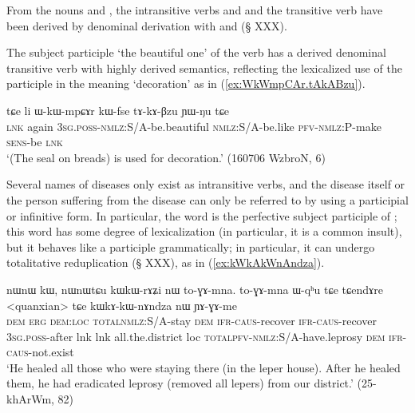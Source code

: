 From the nouns   and  , the intransitive verbs  and  and the transitive verb  have been derived by denominal derivation with  and  (§ XXX).

The subject participle  `the beautiful one' of the verb  has a derived denominal transitive verb  with highly derived semantics, reflecting the lexicalized use of the participle in the meaning `decoration' as in (\ref{ex:WkWmpCAr.tAkABzu}).

 \begin{exe}
\ex \label{ex:WkWmpCAr.tAkABzu}
 \gll tɕe li ɯ-kɯ-mpɕɤr kɯ-fse tɤ-kɤ-βzu ɲɯ-ŋu tɕe    \\
\textsc{lnk} again \textsc{3sg}.\textsc{poss}-\textsc{nmlz}:S/A-be.beautiful \textsc{nmlz}:S/A-be.like \textsc{pfv}-\textsc{nmlz}:P-make \textsc{sens}-be \textsc{lnk} \\
 \glt `(The seal on breads) is used for decoration.' (160706 WzbroN, 6)
\end{exe}

Several names of diseases only exist as intransitive verbs, and the disease itself or the person suffering from the disease can only be referred to by using a participial or infinitive form. In particular, the word  is the perfective subject participle of ; this word has some degree of lexicalization (in particular, it is a common insult), but it behaves like a participle grammatically; in particular, it can undergo totalitative reduplication (§ XXX), as in (\ref{ex:kWkAkWnAndza}).

\begin{exe}
\ex \label{ex:kWkAkWnAndza}
 \gll nɯnɯ kɯ, nɯnɯtɕu kɯ\redp{}kɯ-rɤʑi nɯ to-ɣɤ-mna. to-ɣɤ-mna ɯ-qʰu tɕe tɕendɤre <quanxian> tɕe kɯ\redp{}kɤ-kɯ-nɤndza nɯ ɲɤ-ɣɤ-me \\
 \textsc{dem} \textsc{erg} \textsc{dem}:\textsc{loc} \textsc{total}\redp{}\textsc{nmlz}:S/A-stay \textsc{dem} \textsc{ifr}-\textsc{caus}-recover  \textsc{ifr}-\textsc{caus}-recover  \textsc{3sg}.\textsc{poss}-after lnk lnk all.the.district loc \textsc{total}\redp{}\textsc{pfv}-\textsc{nmlz}:S/A-have.leprosy \textsc{dem} \textsc{ifr}-\textsc{caus}-not.exist \\
\glt `He healed all those who were staying there (in the leper house). After he healed them, he had eradicated leprosy (removed all lepers) from our district.' (25-khArWm, 82)
\end{exe}

